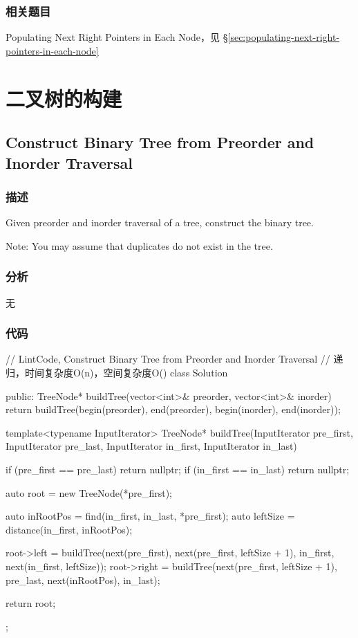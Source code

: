 \subsubsection{相关题目}
\begindot
\item Populating Next Right Pointers in Each Node，见 \S \ref{sec:populating-next-right-pointers-in-each-node}
\myenddot


\section{二叉树的构建} %


\subsection{Construct Binary Tree from Preorder and Inorder Traversal}
\label{sec:construct-binary-tree-from-preorder-and-inorder-traversal}


\subsubsection{描述}
Given preorder and inorder traversal of a tree, construct the binary tree.

Note:
You may assume that duplicates do not exist in the tree.


\subsubsection{分析}
无


\subsubsection{代码}
\begin{Code}
// LintCode, Construct Binary Tree from Preorder and Inorder Traversal
// 递归，时间复杂度O(n)，空间复杂度O(\logn)
class Solution {
public:
    TreeNode* buildTree(vector<int>& preorder, vector<int>& inorder) {
        return buildTree(begin(preorder), end(preorder),
                begin(inorder), end(inorder));
    }

    template<typename InputIterator>
    TreeNode* buildTree(InputIterator pre_first, InputIterator pre_last,
            InputIterator in_first, InputIterator in_last) {
        if (pre_first == pre_last) return nullptr;
        if (in_first == in_last) return nullptr;

        auto root = new TreeNode(*pre_first);

        auto inRootPos = find(in_first, in_last, *pre_first);
        auto leftSize = distance(in_first, inRootPos);

        root->left = buildTree(next(pre_first), next(pre_first,
                leftSize + 1), in_first, next(in_first, leftSize));
        root->right = buildTree(next(pre_first, leftSize + 1), pre_last,
                next(inRootPos), in_last);

        return root;
    }
};
\end{Code}



